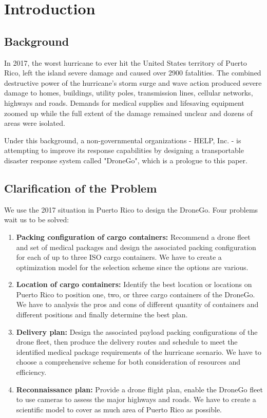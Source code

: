 \documentclass{mcmthesis}
\begin{document}
    \newpage                              
    \setcounter{page}{1}                    
    \tableofcontents                       
    \newpage                             

    \section{Introduction}
    \subsection{Background}                       
	In 2017, the worst hurricane to ever hit the United States territory of Puerto Rico, left the island   severe damage and caused over 2900 fatalities. The combined destructive power of the hurricane's storm surge and wave action produced severe damage to homes, buildings, utility poles, transmission lines, cellular networks, highways and roads. Demands for medical supplies and lifesaving equipment zoomed up while the full extent of the damage remained unclear and dozens of areas were isolated.\par
	Under this background, a non-governmental organizations - HELP, Inc. - is attempting to
	improve its response capabilities by designing a transportable disaster response system called "DroneGo", which is a prologue to this paper. 
	

    \subsection{Clarification of the Problem}             
  We use the 2017 situation in Puerto Rico to design the DroneGo. Four problems wait us to be solved:
    \begin{enumerate}       
    	\item \textbf{Packing configuration of cargo containers:\label{P1}} Recommend a drone fleet and set of medical packages and design the associated packing configuration for each of up to three ISO cargo containers. We have to create a optimization model for the selection scheme since the options are various.
    	\item \textbf{Location of cargo containers:\label{P2}} Identify the best location or locations on Puerto Rico to position one, two, or three cargo containers of the DroneGo. We have to analysis the pros and cons of different quantity of containers and different positions and finally determine the best plan.
    	\item \textbf{Delivery plan:\label{P3}} Design the associated payload packing configurations of the drone fleet, then produce the delivery routes and schedule to meet the identified medical package requirements of the hurricane scenario. We have to choose a comprehensive scheme for both consideration of resources and efficiency.
    	\item \textbf{Reconnaissance plan:\label{P4}} Provide a drone flight plan, enable the DroneGo fleet to use cameras to assess the major highways and roads. We have to create a scientific model to cover as much area of Puerto Rico as possible.
    \end{enumerate}
    
\end{document}

